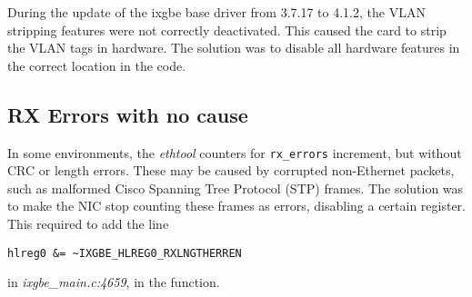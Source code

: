 \begin{bugdata}
\end{bugdata}

During the update of the ixgbe base driver from 3.7.17 to 4.1.2, the VLAN stripping features were not correctly deactivated. This caused the card to strip the VLAN tags in hardware. The solution was to disable all hardware features in the correct location in the code.

\subsection{RX Errors with no cause}

\begin{bugdata}
\bugnotfixed
{}
\end{bugdata}

In some environments, the \textit{ethtool} counters for \texttt{rx\_errors} increment, but without CRC or length errors. These may be caused by corrupted non-Ethernet packets, such as malformed Cisco Spanning Tree Protocol (STP) frames. The solution was to make the NIC stop counting these frames as errors, disabling a certain register. This required to add the line \begin{verbatim}
hlreg0 &= ~IXGBE_HLREG0_RXLNGTHERREN
\end{verbatim} in \textit{ixgbe_main.c:4659}, in the  function.
